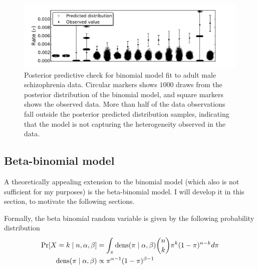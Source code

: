 \begin{figure}[ht]
\begin{center}
\includegraphics[width=\textwidth]{binomial-model-ppc.pdf}

\end{center}
\caption{Posterior predictive check for binomial model fit to adult
  male schizophrenia data.  Circular markers shows $1000$ draws from
  the posterior distribution of the binomial model, and square markers
  shows the observed data.  More than half of the data observations
  fall outside the posterior predicted distribution samples,
  indicating that the model is not capturing the heterogeneity
  observed in the data.}
\label{rate-model-binom-ppc}
\end{figure}

\subsection{Beta-binomial model}
\label{beta-binomial-model}
A theoretically appealing extension to the binomial model (which also
is not sufficient for my purposes) is the beta-binomial model.  I will
develop it in this section, to motivate the following sections.

Formally, the beta binomial random variable is given by the following
probability distribution
\begin{align*}
\operatorname{Pr}[X = k\;|\; n, \alpha, \beta]  &= \int_{\pi}\operatorname{dens}(\pi\;|\; \alpha, \beta) \binom{n}{k}\pi^k(1-\pi)^{n-k} d\pi\\
\operatorname{dens}(\pi\;|\; \alpha, \beta) &\propto \pi^{\alpha-1}(1-\pi)^{\beta-1}
\end{align*}

